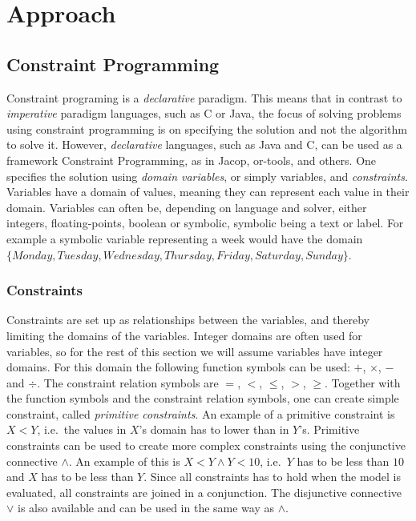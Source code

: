 \chapter{Approach}\label{cha:approach}

\section{Constraint Programming}
Constraint programing is a \emph{declarative} paradigm. This means that in contrast to \emph{imperative} paradigm languages, such as C or Java, the focus of solving problems using constraint programming is on specifying the solution and not the algorithm to solve it. However, \emph{declarative} languages, such as Java and C, can be used as a framework Constraint Programming, as in Jacop, or-tools, and others. One specifies the solution using \emph{domain variables}, or simply variables, and \emph{constraints}. Variables have a domain of values, meaning they can represent each value in their domain. Variables can often be, depending on language and solver, either integers, floating-points, boolean or symbolic, symbolic being a text or label. For example a symbolic variable representing a week would have the domain\\
$\{Monday,Tuesday, Wednesday, Thursday, Friday, Saturday, Sunday\}$.

\subsection{Constraints}
Constraints are set up as relationships between the variables, and thereby limiting the domains of the variables. Integer domains are often used for variables, so for the rest of this section we will assume variables have integer domains. For this domain the following function symbols can be used: $+$, $\times$, $-$ and $\div$. The constraint relation symbols are $=$, $<$, $\leq$, $>$, $\geq$. Together with the function symbols and the constraint relation symbols, one can create simple constraint, called \emph{primitive constraints}. An example of a primitive constraint is $X < Y$, i.e.\ the values in $X$'s domain has to lower than in $Y$'s. Primitive constraints can be used to create more complex constraints using the conjunctive connective $\land$. An example of this is $X < Y \land Y < 10$, i.e.\ $Y$ has to be less than $10$ and $X$ has to be less than $Y$. Since all constraints has to hold when the model is evaluated, all constraints are joined in a conjunction. The disjunctive connective $\lor$ is also available and can be used in the same way as $\land$. 

